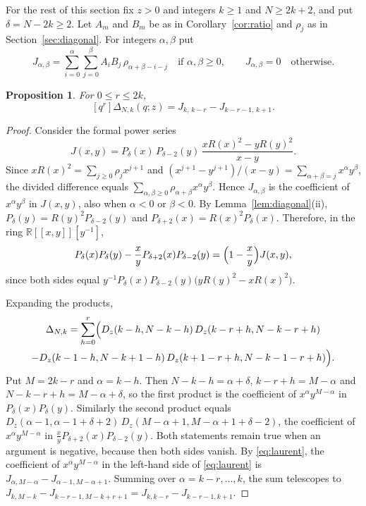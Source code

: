\documentclass{amsart}
\newtheorem{proposition}[theorem]{Proposition}
\theoremstyle{definition}
\theoremstyle{remark}
\numberwithin{equation}{section}
\numberwithin{table}{section}
\newcommand{\Dz}{D_z}
\newcommand{\coef}[1]{[#1]}
\begin{document}
For the rest of this section fix $z>0$ and integers $k\ge 1$ and $N\ge 2k+2$, and put $\delta=N-2k\ge 2$. Let $A_m$ and $B_m$ be as in Corollary~\ref{cor:ratio} and $\rho_j$ as in Section~\ref{sec:diagonal}. For integers $\alpha,\beta$ put
\[
J_{\alpha,\beta}=\sum_{i=0}^{\alpha}\sum_{j=0}^{\beta}A_iB_j\,\rho_{\alpha+\beta-i-j}\quad\text{if } \alpha,\beta\ge 0,\qquad J_{\alpha,\beta}=0\quad\text{otherwise}.
\]

\begin{proposition}\label{prop:telescoping}
For $0\le r\le 2k$,
\[
\coef{q^r}\Delta_{N,k}(q;z)=J_{k,\,k-r}-J_{k-r-1,\,k+1}.
\]
\end{proposition}

\begin{proof}
Consider the formal power series
\[
J(x,y)=P_\delta(x)\,P_{\delta-2}(y)\,\frac{xR(x)^2-yR(y)^2}{x-y}.
\]
Since $xR(x)^2=\sum_{j\ge 0}\rho_jx^{j+1}$ and $(x^{j+1}-y^{j+1})/(x-y)=\sum_{\alpha+\beta=j}x^\alpha y^\beta$, the divided difference equals $\sum_{\alpha,\beta\ge 0}\rho_{\alpha+\beta}x^\alpha y^\beta$. Hence $J_{\alpha,\beta}$ is the coefficient of $x^\alpha y^\beta$ in $J(x,y)$, also when $\alpha<0$ or $\beta<0$. By Lemma~\ref{lem:diagonal}(ii), $P_\delta(y)=R(y)^2P_{\delta-2}(y)$ and $P_{\delta+2}(x)=R(x)^2P_\delta(x)$. Therefore, in the ring $\mathbb{R}[[x,y]][y^{-1}]$,
\begin{equation}\label{eq:laurent}
P_\delta(x)P_\delta(y)-\frac{x}{y}P_{\delta+2}(x)P_{\delta-2}(y)=\Bigl(1-\frac{x}{y}\Bigr)J(x,y),
\end{equation}
since both sides equal $y^{-1}P_\delta(x)P_{\delta-2}(y)\bigl(yR(y)^2-xR(x)^2\bigr)$.

Expanding the products,
\begin{multline*}
\coef{q^r}\Delta_{N,k}=\sum_{h=0}^{r}\Bigl(\Dz(k-h,N-k-h)\,\Dz(k-r+h,N-k-r+h)\\
-\Dz(k-1-h,N-k+1-h)\,\Dz(k+1-r+h,N-k-1-r+h)\Bigr).
\end{multline*}
Put $M=2k-r$ and $\alpha=k-h$. Then $N-k-h=\alpha+\delta$, $k-r+h=M-\alpha$ and $N-k-r+h=M-\alpha+\delta$, so the first product is the coefficient of $x^\alpha y^{M-\alpha}$ in $P_\delta(x)P_\delta(y)$. Similarly the second product equals $\Dz(\alpha-1,\alpha-1+\delta+2)\,\Dz(M-\alpha+1,M-\alpha+1+\delta-2)$, the coefficient of $x^\alpha y^{M-\alpha}$ in $\frac{x}{y}P_{\delta+2}(x)P_{\delta-2}(y)$. Both statements remain true when an argument is negative, because then both sides vanish. By \eqref{eq:laurent}, the coefficient of $x^\alpha y^{M-\alpha}$ in the left-hand side of \eqref{eq:laurent} is $J_{\alpha,M-\alpha}-J_{\alpha-1,M-\alpha+1}$. Summing over $\alpha=k-r,\dots,k$, the sum telescopes to $J_{k,M-k}-J_{k-r-1,M-k+r+1}=J_{k,k-r}-J_{k-r-1,k+1}$.
\end{proof}
\end{document}
